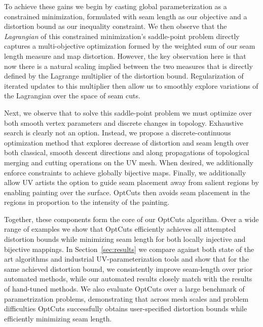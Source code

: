   To achieve these gains we begin by casting global parameterization as a constrained minimization, formulated with seam length as our objective and a distortion bound as our inequality constraint. We then observe that the \emph{Lagrangian} of this constrained minimization's saddle-point problem directly captures a multi-objective optimization formed by the weighted sum of our seam length measure and map distortion. However, the key observation here is that now there is a natural scaling implied between the two measures that is directly defined by the Lagrange multiplier of the distortion bound. Regularization of iterated updates to this multiplier then allow us to smoothly explore variations of the Lagrangian over the space of seam cuts. 
  
  Next, we observe that to solve this saddle-point problem we must optimize over both smooth vertex parameters and discrete changes in topology. Exhaustive search is clearly not an option. Instead, we propose a discrete-continuous optimization method that explores decrease of distortion and seam length over both classical, smooth descent directions and along propagations of topological merging and cutting operations on the UV mesh. When desired, we additionally enforce constraints to achieve globally bijective maps. Finally, we additionally allow UV artists the option to guide seam placement away from salient regions by enabling painting over the surface. OptCuts then avoids seam placement in the regions in proportion to the intensity of the painting.
  
  Together, these components form the core of our OptCuts algorithm. Over a wide range of examples we show that OptCuts efficiently achieves all attempted distortion bounds while minimizing seam length for both locally injective and bijective mappings. In Section~\ref{sec:results} we compare against both state of the art algorithms and industrial UV-parameterization tools and show that for the same achieved distortion bound, we consistently improve seam-length over prior automated methods, while our automated results closely match with the results of hand-tuned methods. We also evaluate OptCuts over a large benchmark of parametrization problems, demonstrating that across mesh scales and problem difficulties OptCuts successfully obtains user-specified distortion bounds while efficiently minimizing seam length. 
  
